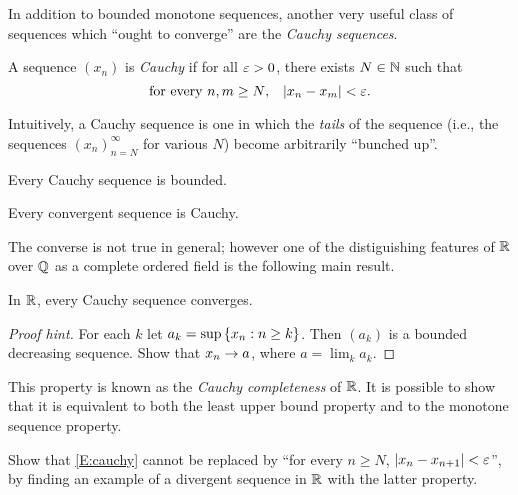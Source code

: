 \documentclass{book}
\begin{document}
In addition to bounded monotone sequences, another very useful class of sequences which ``ought to converge'' are the {\em Cauchy sequences}.
\begin{defn}
A sequence $(x_n)$ is {\em Cauchy} if for all $\varepsilon > 0$, there exists $N \in \mathbb{N}$ such that
\begin{equation}
	\text{for every $n, m \geq N$,}
	\quad
	\lvert x_n - x_m\rvert < \varepsilon.
	\label{E:cauchy}
\end{equation}
\label{D:cauchy}
\end{defn}
\begin{rmk}
Intuitively, a Cauchy sequence is one in which the {\em tails} of the sequence (i.e., the sequences $(x_n)_{n=N}^\infty$ for various $N$) become arbitrarily ``bunched up''.
\end{rmk}

\begin{prop}
Every Cauchy sequence is bounded.
\label{P:cauchy_bndd}
\end{prop}

\begin{prop}
Every convergent sequence is Cauchy.
\label{P:convergent_cauchy}
\end{prop}

The converse is not true in general; however one of the distiguishing features of $\mathbb{R}$ over $\mathbb{Q}$ as a complete
ordered field is the following main result.

\begin{thm}
In $\mathbb{R}$, every Cauchy sequence converges.
\label{T:R_cauchy_complete}
\end{thm}
\begin{proof}[Proof hint]
For each $k$ let $a_k = \sup \left\{ x_n : n \geq k \right\}$. Then $(a_k)$ is a bounded decreasing sequence. Show that $x_n \rightarrow a$, 
where $a = \lim_k a_k$.
\end{proof}

\begin{rmk}
This property is known as the {\em Cauchy completeness} of $\mathbb{R}$. It is possible to
show that it is equivalent to both the least upper bound property and to the monotone
sequence property.
\end{rmk}

\begin{ex}
Show that \eqref{E:cauchy} cannot be replaced by ``for every $n \geq N$, $\lvert x_n - x_{n+1}\rvert < \varepsilon$'', by finding
an example of a divergent sequence in $\mathbb{R}$ with the latter property. 
\label{Ex:divergent_almost_cauchy}
\end{ex}
\end{document}
